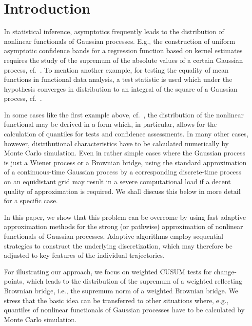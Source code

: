 \documentclass[a4paper]{amsart}
\theoremstyle{definition}
\theoremstyle{plain}
\begin{document}
\maketitle


\section{Introduction}

In statistical inference, asymptotics frequently leads to the
distribution of nonlinear functionals of Gaussian processes. E.g., the
construction of uniform asymptotic confidence bands for a regression
function based on kernel estimates requires the study of the supremum
of the absolute values of a certain Gaussian process,
cf.\ \citet*[Sec.~4.3]{book:Haerdle90}. To mention another
example, for testing the equality of mean functions in functional data
analysis, a test statistic is used which under the hypothesis converges
in distribution to an integral of the square of a Gaussian process,
cf.\ \citet*[Sec.~5.1]{book:HorvKoko12}.

In some cases like the first example above,
cf.\ \citet*{BickRos73}, the distribution of the nonlinear
functional may be derived in a form which, in particular, allows for the
calculation of quantiles for tests and confidence assessments. In many
other cases, however, distributional characteristics have to be
calculated numerically by Monte Carlo simulation. Even in rather simple
cases where the Gaussian process is just a Wiener process or a
Brownian bridge, using the standard approximation of a
continuous-time Gaussian process by a corresponding discrete-time process
on an equidistant grid may result in a severe computational load if a
decent quality of approximation is required. We shall discuss this
below in more detail for a specific case.

In this paper, we show that this problem can be overcome by using fast
adaptive approximation methods for the strong (or pathwise)
approximation of nonlinear functionals of Gaussian processes.
Adaptive algorithms employ sequential strategies to construct
the underlying discretization, which may therefore be adjusted to key
features of the individual trajectories.

For illustrating our approach, we focus on weighted CUSUM tests for
change-points, which leads to the distribution of the supremum of
a weighted reflecting Brownian bridge,
i.e., the supremum norm of a weighted Brownian bridge.
We stress that the basic idea can be transferred to other situations
where, e.g., quantiles of nonlinear functionals of Gaussian processes
have to be calculated by Monte Carlo simulation.
\end{document}
